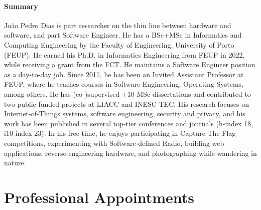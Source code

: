 \documentclass[10pt, a4paper]{article}
\begin{document}
\paragraph{Summary} João Pedro Dias is part researcher on the thin line between hardware and software, and part Software Engineer. He has a BSc+MSc in Informatics and Computing Engineering by the Faculty of Engineering, University of Porto (FEUP). He earned his Ph.D. in Informatics Engineering from FEUP in 2022, while receiving a grant from the FCT. He maintains a Software Engineer position as a day-to-day job. Since 2017, he has been an Invited Assistant Professor at FEUP, where he teaches courses in Software Engineering, Operating Systems, among others. He has (co-)supervised +10 MSc dissertations and contributed to two public-funded projects at LIACC and INESC TEC. His research focuses on Internet-of-Things systems, software engineering, security and privacy, and his work has been published in several top-tier conferences and journals (h-index 18, i10-index 23). In his free time, he enjoys participating in Capture The Flag competitions, experimenting with Software-defined Radio, building web applications, reverse-engineering hardware, and photographing while wandering in nature.
\vspace{-1.1em}

\section*{Professional Appointments}
\end{document}
